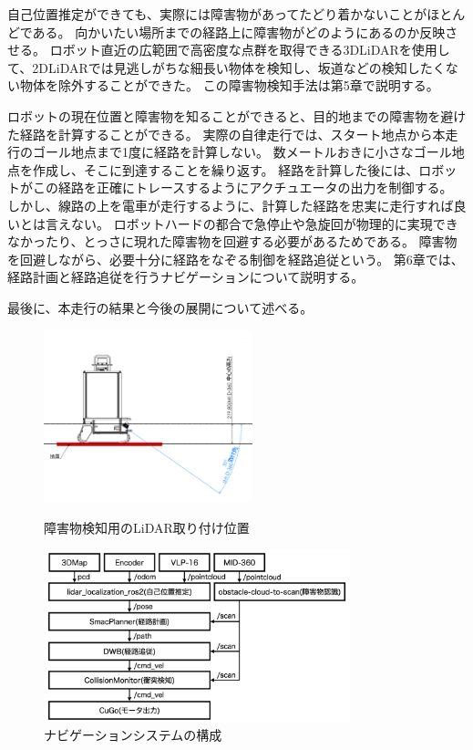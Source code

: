 自己位置推定ができても、実際には障害物があってたどり着かないことがほとんどである。
向かいたい場所までの経路上に障害物がどのようにあるのか反映させる。
ロボット直近の広範囲で高密度な点群を取得できる3DLiDARを使用して、2DLiDARでは見逃しがちな細長い物体を検知し、坂道などの検知したくない物体を除外することができた。
この障害物検知手法は第5章で説明する。

ロボットの現在位置と障害物を知ることができると、目的地までの障害物を避けた経路を計算することができる。
実際の自律走行では、スタート地点から本走行のゴール地点まで1度に経路を計算しない。
数メートルおきに小さなゴール地点を作成し、そこに到達することを繰り返す。
経路を計算した後には、ロボットがこの経路を正確にトレースするようにアクチュエータの出力を制御する。
しかし、線路の上を電車が走行するように、計算した経路を忠実に走行すれば良いとは言えない。
ロボットハードの都合で急停止や急旋回が物理的に実現できなかったり、とっさに現れた障害物を回避する必要があるためである。
障害物を回避しながら、必要十分に経路をなぞる制御を経路追従という。
第6章では、経路計画と経路追従を行うナビゲーションについて説明する。

最後に、本走行の結果と今後の展開について述べる。

\begin{figure}[htbp]
    \centering
    \begin{minipage}[b]{0.45\hsize}
       \centering
       \includegraphics[height=5cm]{fig/obstacle_detection_range_sideview.png}
       \caption{障害物検知用のLiDAR取り付け位置}
       \label{fig:detection}
    \end{minipage}
    \begin{minipage}[b]{0.45\hsize}
       \centering
       \includegraphics[height=5cm]{fig/system.png}
       \caption{ナビゲーションシステムの構成}
       \label{fig:system}
    \end{minipage}
\end{figure}